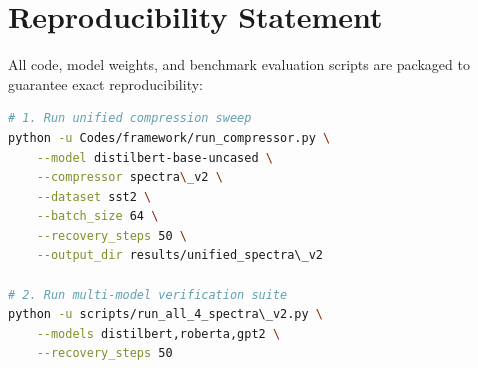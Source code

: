 \section{Reproducibility Statement}
All code, model weights, and benchmark evaluation scripts are packaged to guarantee exact reproducibility:
\begin{lstlisting}[language=bash]
# 1. Run unified compression sweep
python -u Codes/framework/run_compressor.py \
    --model distilbert-base-uncased \
    --compressor spectra\_v2 \
    --dataset sst2 \
    --batch_size 64 \
    --recovery_steps 50 \
    --output_dir results/unified_spectra\_v2

# 2. Run multi-model verification suite
python -u scripts/run_all_4_spectra\_v2.py \
    --models distilbert,roberta,gpt2 \
    --recovery_steps 50
\end{lstlisting}
